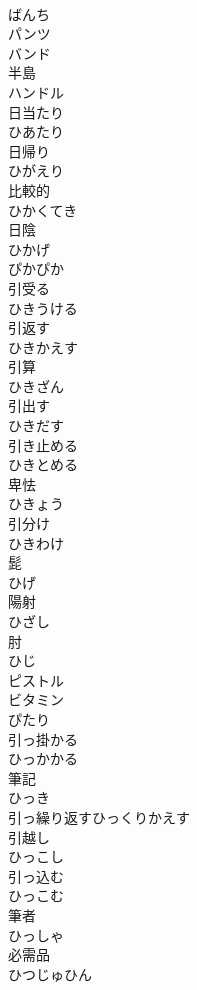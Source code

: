 \documentclass[8pt]{extreport}
\begin{document}
\begin{CJK}{UTF8}{min}
\\	ばんち	
\\	パンツ	
\\	バンド	
\\	半島 
\\	ハンドル	
\\	日当たり 
\\	ひあたり	
\\	日帰り 
\\	ひがえり	
\\	比較的 
\\	ひかくてき	
\\	日陰 
\\	ひかげ	
\\	ぴかぴか	
\\	引受る 
\\	ひきうける	
\\	引返す 
\\	ひきかえす	
\\	引算 
\\	ひきざん	
\\	引出す 
\\	ひきだす	
\\	引き止める 
\\	ひきとめる	
\\	卑怯 
\\	ひきょう	
\\	引分け 
\\	ひきわけ	
\\	髭 
\\	ひげ	
\\	陽射 
\\	ひざし	
\\	肘 
\\	ひじ	
\\	ピストル	
\\	ビタミン	
\\	ぴたり	
\\	引っ掛かる 
\\	ひっかかる	
\\	筆記 
\\	ひっき	
\\	引っ繰り返すひっくりかえす	
\\	引越し 
\\	ひっこし	
\\	引っ込む 
\\	ひっこむ	
\\	筆者 
\\	ひっしゃ	
\\	必需品 
\\	ひつじゅひん	

\end{CJK}
\end{document}
